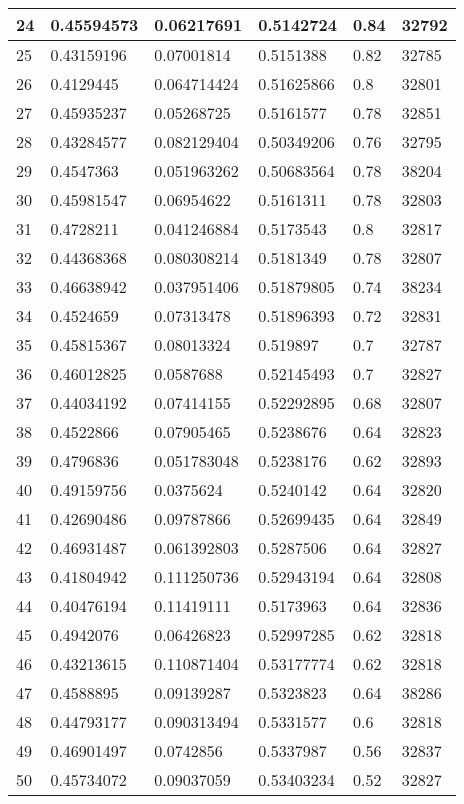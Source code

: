 \begin{longtable}{|l|l|l|l|l|l|}
24 & 0.45594573 & 0.06217691 & 0.5142724 & 0.84 & 32792 \\ \hline 
25 & 0.43159196 & 0.07001814 & 0.5151388 & 0.82 & 32785 \\ \hline 
26 & 0.4129445 & 0.064714424 & 0.51625866 & 0.8 & 32801 \\ \hline 
27 & 0.45935237 & 0.05268725 & 0.5161577 & 0.78 & 32851 \\ \hline 
28 & 0.43284577 & 0.082129404 & 0.50349206 & 0.76 & 32795 \\ \hline 
29 & 0.4547363 & 0.051963262 & 0.50683564 & 0.78 & 38204 \\ \hline 
30 & 0.45981547 & 0.06954622 & 0.5161311 & 0.78 & 32803 \\ \hline 
31 & 0.4728211 & 0.041246884 & 0.5173543 & 0.8 & 32817 \\ \hline 
32 & 0.44368368 & 0.080308214 & 0.5181349 & 0.78 & 32807 \\ \hline 
33 & 0.46638942 & 0.037951406 & 0.51879805 & 0.74 & 38234 \\ \hline 
34 & 0.4524659 & 0.07313478 & 0.51896393 & 0.72 & 32831 \\ \hline 
35 & 0.45815367 & 0.08013324 & 0.519897 & 0.7 & 32787 \\ \hline 
36 & 0.46012825 & 0.0587688 & 0.52145493 & 0.7 & 32827 \\ \hline 
37 & 0.44034192 & 0.07414155 & 0.52292895 & 0.68 & 32807 \\ \hline 
38 & 0.4522866 & 0.07905465 & 0.5238676 & 0.64 & 32823 \\ \hline 
39 & 0.4796836 & 0.051783048 & 0.5238176 & 0.62 & 32893 \\ \hline 
40 & 0.49159756 & 0.0375624 & 0.5240142 & 0.64 & 32820 \\ \hline 
41 & 0.42690486 & 0.09787866 & 0.52699435 & 0.64 & 32849 \\ \hline 
42 & 0.46931487 & 0.061392803 & 0.5287506 & 0.64 & 32827 \\ \hline 
43 & 0.41804942 & 0.111250736 & 0.52943194 & 0.64 & 32808 \\ \hline 
44 & 0.40476194 & 0.11419111 & 0.5173963 & 0.64 & 32836 \\ \hline 
45 & 0.4942076 & 0.06426823 & 0.52997285 & 0.62 & 32818 \\ \hline 
46 & 0.43213615 & 0.110871404 & 0.53177774 & 0.62 & 32818 \\ \hline 
47 & 0.4588895 & 0.09139287 & 0.5323823 & 0.64 & 38286 \\ \hline 
48 & 0.44793177 & 0.090313494 & 0.5331577 & 0.6 & 32818 \\ \hline 
49 & 0.46901497 & 0.0742856 & 0.5337987 & 0.56 & 32837 \\ \hline 
50 & 0.45734072 & 0.09037059 & 0.53403234 & 0.52 & 32827 \\ \hline 
\end{longtable}